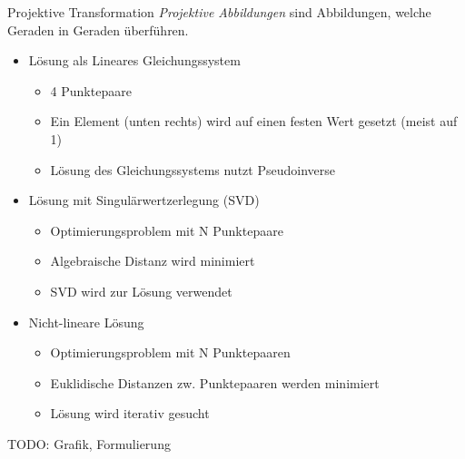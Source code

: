 \begin{defi}{Projektive Transformation}
    \emph{Projektive Abbildungen} sind Abbildungen, welche Geraden in Geraden überführen.

    \begin{itemize}
        \item Lösung als Lineares Gleichungssystem
              \begin{itemize}
                  \item 4 Punktepaare
                  \item Ein Element (unten rechts) wird auf einen festen Wert gesetzt (meist auf 1)
                  \item Lösung des Gleichungssystems nutzt Pseudoinverse
              \end{itemize}
        \item Lösung mit Singulärwertzerlegung (SVD)
              \begin{itemize}
                  \item Optimierungsproblem mit N Punktepaare
                  \item Algebraische Distanz wird minimiert
                  \item SVD wird zur Lösung verwendet
              \end{itemize}
        \item Nicht-lineare Lösung
              \begin{itemize}
                  \item Optimierungsproblem mit N Punktepaaren
                  \item Euklidische Distanzen zw. Punktepaaren werden minimiert
                  \item Lösung wird iterativ gesucht
              \end{itemize}
    \end{itemize}

    TODO: Grafik, Formulierung
\end{defi}